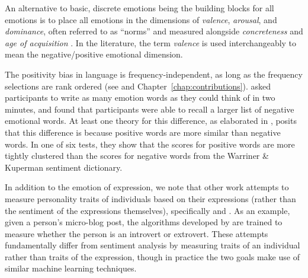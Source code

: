 An alternative to basic, discrete emotions being the building blocks for all emotions is to place all emotions in the dimensions of \textit{valence}, \textit{arousal}, and \textit{dominance}, often referred to as ``norms'' and measured alongside \textit{concreteness} and \textit{age of acquisition} \citep{lindquist2016language}.
In the literature, the term \textit{valence} is used interchangeably to mean the negative/positive emotional dimension.

The positivity bias in language is frequency-independent, as long as the frequency selections are rank ordered (see \cite{dodds2015human} and Chapter~\ref{chap:contributions}).
\cite{schrauf2004preponderance} asked participants to write as many emotion words as they could think of in two minutes, and found that participants were able to recall a larger list of negative emotional words.
At least one theory for this difference, as elaborated in \cite{koch2016general}, posits that this difference is because positive words are more similar than negative words.
In one of six tests, they show that the scores for positive words are more tightly clustered than the scores for negative words from the Warriner \& Kuperman sentiment dictionary.

In addition to the emotion of expression, we note that other work attempts to measure personality traits of individuals based on their expressions (rather than the sentiment of the expressions themselves), specifically \cite{kosinski2013private} and \cite{youyou2015computer}.
As an example, given a person's micro-blog post, the algorithms developed by \cite{kosinski2013private} are trained to measure whether the person is an introvert or extrovert.
These attempts fundamentally differ from sentiment analysis by measuring traits of an individual rather than traits of the expression, though in practice the two goals make use of similar machine learning techniques.

